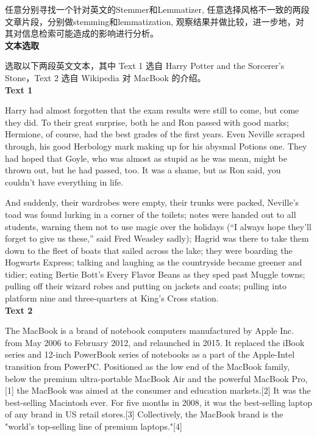 \begin{homeworkProblem}

    任意分别寻找一个针对英文的Stemmer和Lemmatizer, 任意选择风格不一致的两段文章片段，分别做stemming和lemmatization, 观察结果并做比较，进一步地，对其对信息检索可能造成的影响进行分析。 
    \\

    \textbf{\large 文本选取}

    选取以下两段英文文本，其中 Text 1 选自 Harry Potter and the Sorcerer's Stone，Text 2 选自 Wikipedia 对 MacBook 的介绍。
    \\

    \textbf{Text 1}

    Harry had almost forgotten that the exam results were still to come, but come they did. To their great surprise, both he and Ron passed with good marks; Hermione, of course, had the best grades of the first years. Even Neville scraped through, his good Herbology mark making up for his abysmal Potions one. They had hoped that Goyle, who was almost as stupid as he was mean, might be thrown out, but he had passed, too. It was a shame, but as Ron said, you couldn’t have everything in life.

    And suddenly, their wardrobes were empty, their trunks were packed, Neville’s toad was found lurking in a corner of the toilets; notes were handed out to all students, warning them not to use magic over the holidays (“I always hope they’ll forget to give us these,” said Fred Weasley sadly); Hagrid was there to take them down to the fleet of boats that sailed across the lake; they were boarding the Hogwarts Express; talking and laughing as the countryside became greener and tidier; eating Bertie Bott’s Every Flavor Beans as they sped past Muggle towns; pulling off their wizard robes and putting on jackets and coats; pulling into platform nine and three-quarters at King’s Cross station.
    \\

    \textbf{Text 2}

    The MacBook is a brand of notebook computers manufactured by Apple Inc. from May 2006 to February 2012, and relaunched in 2015. It replaced the iBook series and 12-inch PowerBook series of notebooks as a part of the Apple-Intel transition from PowerPC. Positioned as the low end of the MacBook family, below the premium ultra-portable MacBook Air and the powerful MacBook Pro,[1] the MacBook was aimed at the consumer and education markets.[2] It was the best-selling Macintosh ever. For five months in 2008, it was the best-selling laptop of any brand in US retail stores.[3] Collectively, the MacBook brand is the "world's top-selling line of premium laptops."[4]


\end{homeworkProblem}
